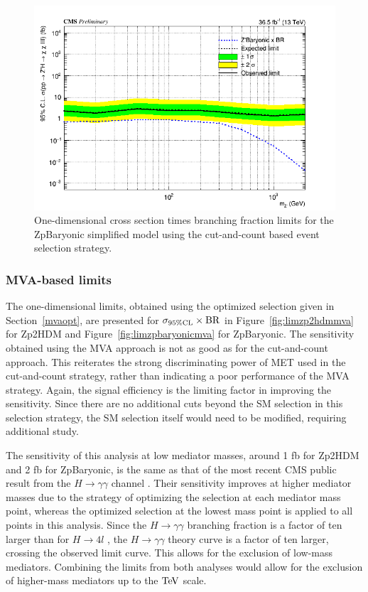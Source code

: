 \begin{figure}[tbh]
\centering
\includegraphics[width=6in]{figures/sigma_limits_4mu_ZpBaryonic.png}
\caption{One-dimensional cross section times branching fraction limits for the ZpBaryonic simplified model using the cut-and-count based event selection strategy.}
\label{fig:limzpbaryonic}
\end{figure}

\subsubsection{MVA-based limits}

The one-dimensional limits, obtained using the optimized selection given in Section~\ref{mvaopt}, are presented for $\sigma_{95\% \rm{CL}}\times \rm{BR}$ in Figure~\ref{fig:limzp2hdmmva} for Zp2HDM and Figure~\ref{fig:limzpbaryonicmva} for ZpBaryonic. The sensitivity obtained using the MVA approach is not as good as for the cut-and-count approach. This reiterates the strong discriminating power of MET used in the cut-and-count strategy, rather than indicating a poor performance of the MVA strategy. Again, the signal efficiency is the limiting factor in improving the sensitivity. Since there are no additional cuts beyond the SM selection in this selection strategy, the SM selection itself would need to be modified, requiring additional study. 

The sensitivity of this analysis at low mediator masses, around 1 fb for Zp2HDM and 2 fb for ZpBaryonic, is the same as that of the most recent CMS public result from the $H\rightarrow \gamma\gamma$ channel \cite{CMS-PAS-EXO-16-054}. Their sensitivity improves at higher mediator masses due to the strategy of optimizing the selection at each mediator mass point, whereas the optimized selection at the lowest mass point is applied to all points in this analysis. Since the $H\rightarrow \gamma\gamma$ branching fraction is a factor of ten larger than for $H\rightarrow 4l$ \cite{YR4}, the $H\rightarrow \gamma\gamma$ theory curve is a factor of ten larger, crossing the observed limit curve. This allows for the exclusion of low-mass mediators. Combining the limits from both analyses would allow for the exclusion of higher-mass mediators up to the $\mathrm{Te\kern -0.1em V}$ scale.

